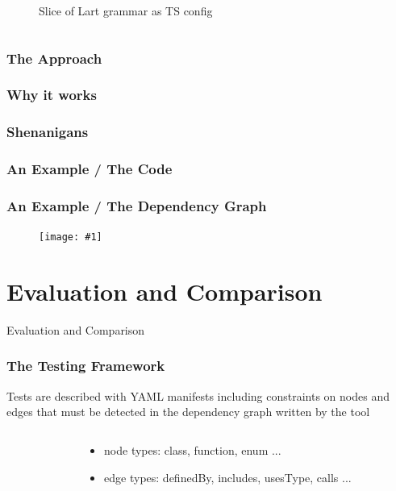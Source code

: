 \documentclass[dvipsnames, 10pt, table]{beamer}
\newcommand{\putimage}[2] {
  \begin{figure}[H]
    \centering
    \texttt{[image: \#1]}
	\end{figure}
}
\begin{document}
\begin{frame}
\begin{columns}
\begin{column}{0.5\textwidth}
\begin{figure}
\begin{center}
          \caption{Slice of Lart grammar as TS config}
        \end{center}
      \end{figure}
    \end{column}
  \end{columns}
\end{frame}

\begin{frame}
  \frametitle{The Approach}
\end{frame}

\begin{frame}
  \frametitle{Why it works}
\end{frame}

\begin{frame}
  \frametitle{Shenanigans}
\end{frame}

\begin{frame}[fragile]
  \frametitle{An Example / The Code}
  
\end{frame}

\begin{frame}
  \frametitle{An Example / The Dependency Graph}
  \putimage{figures/approach/depgraph-example.png}{0.99}
\end{frame}

\section{Evaluation and Comparison}
\begin{frame}
  \centering
  \Huge
  Evaluation and Comparison
\end{frame}

\begin{frame}[fragile]
  \frametitle{The Testing Framework}

  \begin{block}{}
    Tests are described with YAML manifests including constraints on nodes and edges that must be detected in the dependency graph written by the tool
  \end{block}

  \begin{columns}
    \begin{column}{0.64\textwidth}
      
    \end{column}
    \begin{column}{0.34\textwidth}
      \begin{itemize}
        \item node types: class, function, enum ...
        \item edge types: definedBy, includes, usesType, calls ...
      \end{itemize}
    \end{column}
  \end{columns}
\end{frame}
\end{document}
